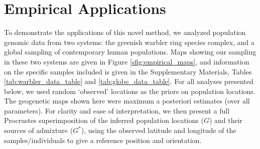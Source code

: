 \documentclass[12pt]{article}
\newcommand{\identifyadmixsource}[1]{{#1^{*}}}
\begin{document}
\section*{Empirical Applications}
To demonstrate the applications of this novel method, we analyzed population genomic data from two systems: the greenish warbler ring species complex, and a global sampling of contemporary human populations.  Maps showing our sampling in these two systems are given in Figure \ref{sfig:empirical_maps}, and information on the specific samples included is given in the Supplementary Materials, Tables \ref{tab:warbler_data_table} and \ref{tab:globe_data_table}.  
For all analyses presented below, we used random `observed' locations as the priors on population locations.
The geogenetic maps shown here were maximum a posteriori estimates (over all parameters). For clarity and ease of interpretation, we then present a full Procrustes superimposition of the inferred population locations ($G$) and their sources of admixture ($\identifyadmixsource{G}$), using the observed latitude and longitude of the samples/individuals to give a reference position and orientation.
\end{document}
